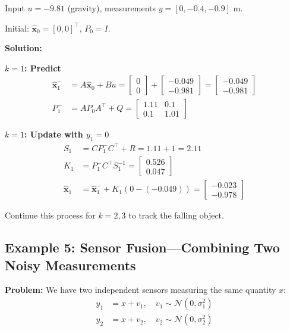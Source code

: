 Input $u = -9.81$ (gravity), measurements $y = [0, -0.4, -0.9]$ m.

Initial: $\hat{\mathbf{x}}_0 = [0, 0]^\top$, $P_0 = I$.

\textbf{Solution:}

\textbf{$k = 1$: Predict}
\begin{align}
\hat{\mathbf{x}}_1^- &= A\hat{\mathbf{x}}_0 + Bu = \begin{bmatrix} 0 \\ 0 \end{bmatrix} + \begin{bmatrix} -0.049 \\ -0.981 \end{bmatrix} = \begin{bmatrix} -0.049 \\ -0.981 \end{bmatrix} \\
P_1^- &= AP_0A^\top + Q = \begin{bmatrix} 1.11 & 0.1 \\ 0.1 & 1.01 \end{bmatrix}
\end{align}

\textbf{$k = 1$: Update with $y_1 = 0$}
\begin{align}
S_1 &= CP_1^-C^\top + R = 1.11 + 1 = 2.11 \\
K_1 &= P_1^-C^\top S_1^{-1} = \begin{bmatrix} 0.526 \\ 0.047 \end{bmatrix} \\
\hat{\mathbf{x}}_1 &= \hat{\mathbf{x}}_1^- + K_1(0 - (-0.049)) = \begin{bmatrix} -0.023 \\ -0.978 \end{bmatrix}
\end{align}

Continue this process for $k = 2, 3$ to track the falling object.

\subsection{Example 5: Sensor Fusion---Combining Two Noisy Measurements}

\textbf{Problem:} We have two independent sensors measuring the same quantity $x$:
\begin{align}
y_1 &= x + v_1, \quad v_1 \sim \mathcal{N}(0, \sigma_1^2) \\
y_2 &= x + v_2, \quad v_2 \sim \mathcal{N}(0, \sigma_2^2)
\end{align}

